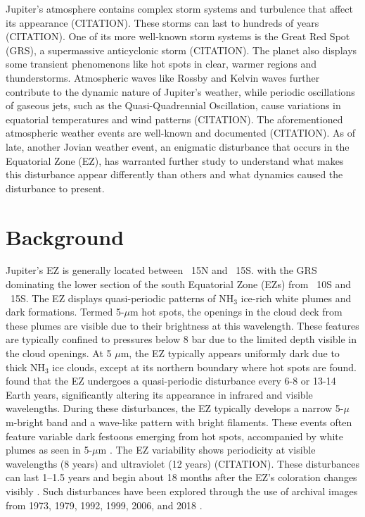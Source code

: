\documentclass[a4paper,fleqn]{cas-dc}
\begin{document}
Jupiter's atmosphere contains complex storm systems and turbulence that affect its appearance (CITATION). These storms can last to hundreds of years (CITATION). One of its more well-known storm systems is the Great Red Spot (GRS), a supermassive anticyclonic storm (CITATION). The planet also displays some transient phenomenons like hot spots in clear, warmer regions and thunderstorms. Atmospheric waves like Rossby and Kelvin waves further contribute to the dynamic nature of Jupiter's weather, while periodic oscillations of gaseous jets, such as the Quasi-Quadrennial Oscillation, cause variations in equatorial temperatures and wind patterns (CITATION). The aforementioned atmospheric weather events are well-known and documented (CITATION). As of late, another Jovian weather event, an enigmatic disturbance that occurs in the Equatorial Zone (EZ), has warranted further study to understand what makes this disturbance appear differently than others and what dynamics caused the disturbance to present.

\section{Background}
Jupiter’s EZ is generally located between ~15\textdegree N and ~15\textdegree S. with the GRS dominating the lower section of the south Equatorial Zone (EZs) from ~10\textdegree S and ~15\textdegree S. The EZ displays quasi-periodic patterns of NH$_3$ ice-rich white plumes and dark formations. Termed 5-$\mu$m hot spots, the openings in the cloud deck from these plumes are visible due to their brightness at this wavelength. These features are typically confined to pressures below 8 bar due to the limited depth visible in the cloud openings. At 5 $\mu$m, the EZ typically appears uniformly dark due to thick NH$_3$ ice clouds, except at its northern boundary where hot spots are found.\citep{antunano2018infrared} found that the EZ undergoes a quasi-periodic disturbance every 6-8 or 13-14 Earth years, significantly altering its appearance in infrared and visible wavelengths. During these disturbances, the EZ typically develops a narrow 5-$\mu$m-bright band and a wave-like pattern with bright filaments. These events often feature variable dark festoons emerging from hot spots, accompanied by white plumes as seen in 5-$\mu$m \citep{antunano2018infrared}. The EZ variability shows periodicity at visible wavelengths (8 years) and ultraviolet (12 years) (CITATION). These disturbances can last 1–1.5 years and begin about 18 months after the EZ's coloration changes visibly \cite{antunano2020characterizing}. Such disturbances have been explored through the use of archival images from 1973, 1979, 1992, 1999, 2006, and 2018 \cite{antunano2020characterizing, 2022DPS....5420501D, 1994JGR....99.8425S, 1988Icar...76..533S}. 
\end{document}
